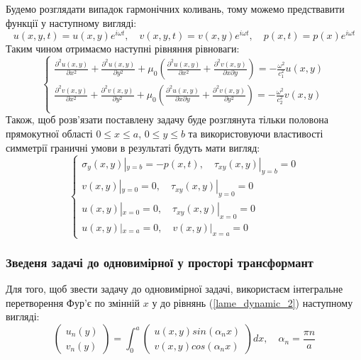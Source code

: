 Будемо розглядати випадок гармонічних коливань, тому можемо предствавити функції у наступному вигляді:
\begin{equation}
    u(x,y,t) = u(x,y) e^{i \omega t}, \quad v(x,y,t) = v(x,y) e^{i \omega t}, \quad p(x,t) = p(x) e^{i \omega t}
\end{equation}
Таким чином отримаємо наступні рівняння рівноваги:
\begin{equation}\label{lame_dynamic_2}
    \begin{cases}
        \frac{\partial^2 u(x,y)}{\partial x^2} + \frac{\partial^2 u(x,y)}{\partial y^2} + \mu_0 (\frac{\partial^2 u(x,y)}{\partial x^2} + \frac{\partial^2 v(x,y)}{\partial x\partial y}) = -\frac{\omega^2}{c_1^2}  u(x,y) \\
        \frac{\partial^2 v(x,y)}{\partial x^2} + \frac{\partial^2 v(x,y)}{\partial y^2} + \mu_0 (\frac{\partial^2 u(x,y)}{\partial x \partial y} + \frac{\partial^2 v(x,y)}{\partial y^2}) = -\frac{\omega^2}{c_2^2} v(x,y) \\
    \end{cases}
\end{equation}
Також, щоб розв'язати поставлену задачу буде розглянута тільки половона прямокутної області $0 \le x \le a$, $0 \le y \le b$
та використовуючи властивості симметрії граничні умови в результаті будуть мати вигляд:
\begin{equation}\label{bound_dynamic_2}
    \begin{cases}
        \sigma_y(x, y) |_{y=b} = -p(x, t), \quad  \tau_{xy}(x,y) |_{y=b} =0 \\
        v(x,y) |_{y=0} = 0, \quad \tau_{xy}(x,y) |_{y=0} = 0 \\
        u(x,y) |_{x=0} = 0, \quad \tau_{xy}(x,y) |_{x=0} = 0 \\
        u(x,y) |_{x=a} = 0, \quad v(x,y) |_{x=a} = 0
    \end{cases}
\end{equation}

\subsubsection{Зведеня задачі до одновимірної у просторі трансформант}
Для того, щоб звести задачу до одновимірної задачі, використаєм інтегральне перетворення Фур'є по змінній $x$ у до рівнянь (\ref{lame_dynamic_2}) наступному вигляді:
\begin{equation}
    \begin{pmatrix}
        u_n(y) \\
        v_n(y)
    \end{pmatrix} = \int_{0}^{a} 
    \begin{pmatrix}
        u(x,y) sin(\alpha_n x) \\
        v(x,y) cos(\alpha_n x)
    \end{pmatrix} dx, \quad \alpha_n = \frac{\pi n}{a}
\end{equation}

